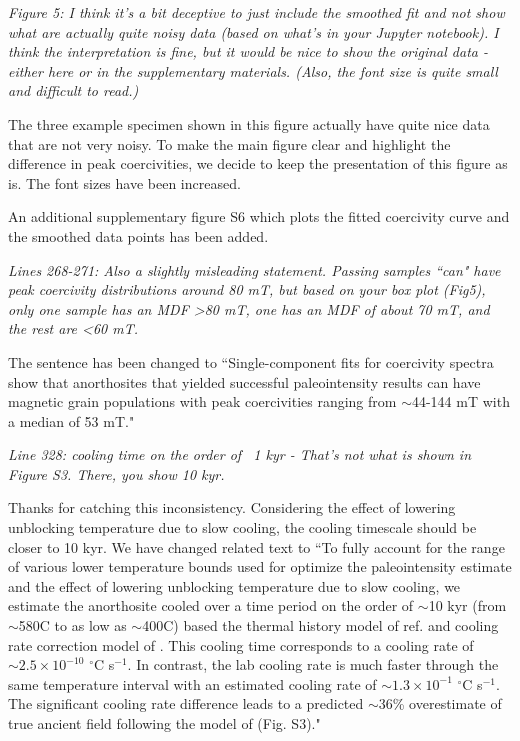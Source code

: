 \documentclass[11pt, letterpaper]{article}
\begin{document}
\begin{flushleft}
\textit{Figure 5: I think it's a bit deceptive to just include the smoothed fit and not show what are actually quite noisy data (based on what's in your Jupyter notebook). I think the interpretation is fine, but it would be nice to show the original data - either here or in the supplementary materials. (Also, the font size is quite small and difficult to read.)}

The three example specimen shown in this figure actually have quite nice data that are not very noisy. To make the main figure clear and highlight the difference in peak coercivities, we decide to keep the presentation of this figure as is. The font sizes have been increased. 

An additional supplementary figure S6 which plots the fitted coercivity curve and the smoothed data points has been added. 

\textit{Lines 268-271: Also a slightly misleading statement. Passing samples ``can" have peak coercivity distributions around 80 mT, but based on your box plot (Fig5), only one sample has an MDF >80 mT, one has an MDF of about 70 mT, and the rest are <60 mT.}

The sentence has been changed to ``Single-component fits for coercivity spectra \cite{Maxbauer2016a} show that anorthosites that yielded successful paleointensity results can have magnetic grain populations with peak coercivities ranging from $\sim$44-144 mT with a median of 53 mT."

\textit{Line 328: cooling time on the order of ~1 kyr - That's not what is shown in Figure S3. There, you show 10 kyr.}

Thanks for catching this inconsistency. Considering the effect of lowering unblocking temperature due to slow cooling, the cooling timescale should be closer to 10 kyr. We have changed related text to ``To fully account for the range of various lower temperature bounds used for optimize the paleointensity estimate and the effect of lowering unblocking temperature due to slow cooling, we estimate the anorthosite cooled over a time period on the order of $\sim$10 kyr (from $\sim$580\textdegree C to as low as $\sim$400\textdegree C) based the thermal history model of ref. \citealp{Zhang2021b} and cooling rate correction model of \cite{Pullaiah1975a}. This cooling time corresponds to a cooling rate of $\sim2.5\times10^{-10}$ $^\circ$C s$^{-1}$. In contrast, the lab cooling rate is much faster through the same temperature interval with an estimated cooling rate of $\sim1.3\times10^{-1}$ $^\circ$C s$^{-1}$. The significant cooling rate difference leads to a predicted $\sim$36\% overestimate of true ancient field following the model of \citealp{Pullaiah1975a} (Fig. S3)."


\end{flushleft}
\end{document}
